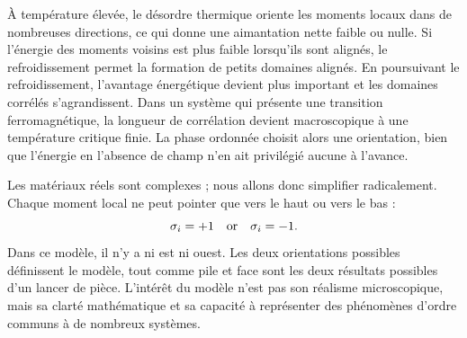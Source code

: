 À température élevée, le désordre thermique oriente les moments locaux dans de nombreuses directions, ce qui donne une aimantation nette faible ou nulle. Si l’énergie des moments voisins est plus faible lorsqu’ils sont alignés, le refroidissement permet la formation de petits domaines alignés. En poursuivant le refroidissement, l’avantage énergétique devient plus important et les domaines corrélés s’agrandissent. Dans un système qui présente une transition ferromagnétique, la longueur de corrélation devient macroscopique à une température critique finie. La phase ordonnée choisit alors une orientation, bien que l’énergie en l’absence de champ n’en ait privilégié aucune à l’avance.

\begin{classroomqa}
\end{classroomqa}

\begin{classroomqa}
\end{classroomqa}

Les matériaux réels sont complexes ; nous allons donc simplifier radicalement. Chaque moment local ne peut pointer que vers le haut ou vers le bas :
\begin{equation}
 \sigma_i=+1\quad\hbox{or}\quad\sigma_i=-1.
 \label{eq:sm8-ising-spin}
\end{equation}
Dans ce modèle, il n’y a ni est ni ouest. Les deux orientations possibles définissent le modèle, tout comme pile et face sont les deux résultats possibles d’un lancer de pièce. L’intérêt du modèle n’est pas son réalisme microscopique, mais sa clarté mathématique et sa capacité à représenter des phénomènes d’ordre communs à de nombreux systèmes.

